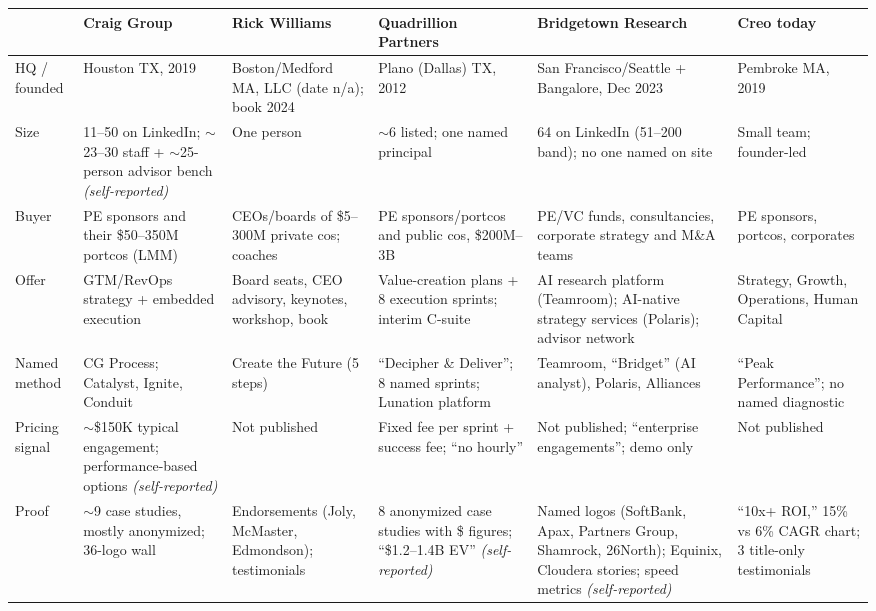 \documentclass[11pt]{article}
\newcommand{\self}{\textcolor{gray!70!black}{\textit{(self-reported)}}}
\begin{document}
\begin{center}
\renewcommand{\arraystretch}{1.25}
\small
\setlength{\tabcolsep}{4pt}
\footnotesize
\begin{longtable}{R{1.9cm} R{2.65cm} R{2.5cm} R{2.65cm} R{2.65cm} R{2.3cm}}
\toprule
 & \textbf{Craig Group} & \textbf{Rick Williams} & \textbf{Quadrillion Partners} & \textbf{Bridgetown Research} & \textbf{Creo today} \\
\midrule
\endhead
HQ / founded & Houston TX, 2019 & Boston/Medford MA, LLC (date n/a); book 2024 & Plano (Dallas) TX, 2012 & San Francisco/Seattle + Bangalore, Dec 2023 & Pembroke MA, 2019 \\
Size & 11--50 on LinkedIn; $\sim$23--30 staff + $\sim$25-person advisor bench \self & One person & $\sim$6 listed; one named principal & 64 on LinkedIn (51--200 band); no one named on site & Small team; founder-led \\
Buyer & PE sponsors and their \$50--350M portcos (LMM) & CEOs/boards of \$5--300M private cos; coaches & PE sponsors/portcos and public cos, \$200M--3B & PE/VC funds, consultancies, corporate strategy and M\&A teams & PE sponsors, portcos, corporates \\
Offer & GTM/RevOps strategy + embedded execution & Board seats, CEO advisory, keynotes, workshop, book & Value-creation plans + 8 execution sprints; interim C-suite & AI research platform (Teamroom); AI-native strategy services (Polaris); advisor network & Strategy, Growth, Operations, Human Capital \\
Named method & CG\texttrademark{} Process; Catalyst\texttrademark{}, Ignite\texttrademark{}, Conduit\texttrademark{} & Create the Future\textregistered{} (5 steps) & ``Decipher \& Deliver''; 8 named sprints; Lunation platform & Teamroom, ``Bridget'' (AI analyst), Polaris, Alliances & ``Peak Performance''; no named diagnostic \\
Pricing signal & $\sim$\$150K typical engagement; performance-based options \self & Not published & Fixed fee per sprint + success fee; ``no hourly'' & Not published; ``enterprise engagements''; demo only & Not published \\
Proof & $\sim$9 case studies, mostly anonymized; 36-logo wall & Endorsements (Joly, McMaster, Edmondson); testimonials & 8 anonymized case studies with \$ figures; ``\$1.2--1.4B EV'' \self & Named logos (SoftBank, Apax, Partners Group, Shamrock, 26North); Equinix, Cloudera stories; speed metrics \self & ``10x+ ROI,'' 15\% vs 6\% CAGR chart; 3 title-only testimonials \\

\end{longtable}
\end{center}
\end{document}
